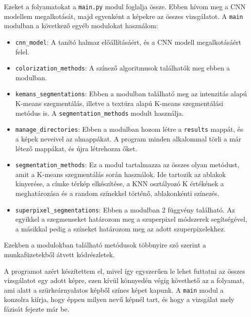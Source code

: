 Ezeket a folyamatokat a \texttt{main.py} modul foglalja össze. Ebben hívom meg a CNN modellem megalkotását, majd egyenként a képekre az összes vizsgálatot. A \texttt{main} modulban a következő egyéb modulokat használom:
\begin{itemize}
\item \texttt{cnn\_model}: A tanító halmaz előállításáért, és a CNN modell megalkotásáért felel.
\item \texttt{colorization\_methods}: A színező algoritmusok találhatók meg ebben a modulban.
\item \texttt{kemans\_segmentations}: Ebben a modulban található meg az intenzitás alapú K-means szegmentálás, illetve a textúra alapú K-means szegmentálási metódus is. A \texttt{segmentation\_methods} modult használja.
\item \texttt{manage\_directories}: Ebben a modulban hozom létre a \texttt{results} mappát, és a képek neveivel az almappákat. A program minden alkalommal törli a már létező mappákat, és újra létrehozza őket.
\item \texttt{segmentation\_methods}: Ez a modul tartalmazza az összes olyan metódust, amit a K-means szegmentálás során használok. Ide tartozik az ablakok kinyerése, a címke térkép elkészítése, a KNN osztályozó K értékének a meghatározása és a random színekkel történő, ablakonkénti színezés.
\item \texttt{superpixel\_segmentations}: Ebben a modulban 2 függvény található. Az egyikkel a szegmenseket határozom meg a szuperpixel módszerek segítségével, a másikkal pedig a színeket határozom meg az adott szuperpixelekhez. 
\end{itemize}

Ezekben a modulokban található metódusok többnyire szó szerint a munkafüzetekből átvett kódrészletek.

A programot azért készítettem el, mivel így egyszerűen le lehet futtatni az összes vizsgálatot egy adott képre, ezen kívül könnyedén végig követhető az a folyamat, ami alatt a szürkeárnyalatos képből színes képet kapunk. A \texttt{main} modul a konzolra kiírja, hogy éppen milyen nevű képnél tart, és hogy a vizsgálat mely fázisát fejezte már be.


